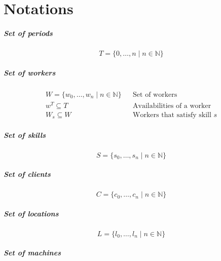 \documentclass[../../thesis.tex]{subfiles}
\begin{document}
\chapter{Notations}
\label{appendix:notations}


\paragraph{Set of periods}
\begin{equation*}
  T = \{ 0, \dots, n \mid n \in \mathbb{N} \}
\end{equation*}


\paragraph{Set of workers}

\begin{align*}
  W = \{ w_0, \dots, w_n \mid n \in \mathbb{N} \} && \text{Set of workers} \\
  w^T \subseteq T && \text{Availabilities of a worker} \\ 
  W_s \subseteq W && \text{Workers that satisfy skill $s$}
\end{align*} 

\paragraph{Set of skills}

\begin{equation*}
  S = \{ s_0, \dots, s_n \mid n \in \mathbb{N} \}
\end{equation*}

\paragraph{Set of clients}

\begin{equation*}
    C = \{ c_0, \dots, c_n \mid n \in \mathbb{N} \}
\end{equation*}

\paragraph{Set of locations}

\begin{equation*}
  L = \{ l_0, \dots, l_n \mid n \in \mathbb{N} \}
\end{equation*}

\paragraph{Set of machines}
\end{document}
